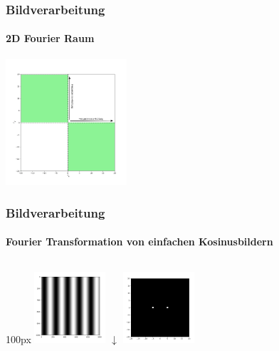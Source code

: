 \begin{frame}
    \frametitle{Bildverarbeitung}
    \framesubtitle{2D Fourier Raum}
    \centering
    \includegraphics[width=170px]{images/04-applications-fourier-space-empty-2.png}
\end{frame}

\begin{frame}
    \frametitle{Bildverarbeitung}
    \framesubtitle{Fourier Transformation von einfachen Kosinusbildern}
    \begin{columns}
        \begin{column}{100px}
            \centering
            \includegraphics[width=100px]{images/04-applications-image-cos.png}
            $\downarrow$
            \includegraphics[width=100px]{images/04-applications-image-cos-ft.png}
        \end{column}
    \end{columns}
\end{frame}

